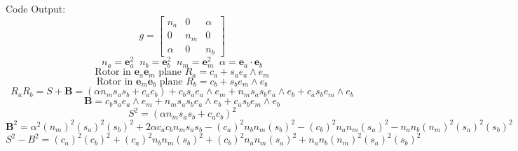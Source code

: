 \documentclass[10pt,fleqn]{report}
\begin{document}
Code Output:
\begin{equation*} g = \left[\begin{matrix}n_{a} & 0 & \alpha \\0 & n_{m} & 0\\\alpha  & 0 & n_{b}\end{matrix}\right] \end{equation*}
\begin{equation*} n_{a} = \bm{e}_{a}^{2}\;\;n_{b} = \bm{e}_{b}^{2}\;\;n_{m} = \bm{e}_{m}^{2}\;\;\alpha = \bm{e}_{a}\cdot\bm{e}_{b} \end{equation*}
\begin{equation*} \mbox{Rotor in }\bm{e}_{a}\bm{e}_{m}\mbox{ plane } R_{a} = c_{a}  + s_{a} e_{a}\wedge e_{m} \end{equation*}
\begin{equation*} \mbox{Rotor in }\bm{e}_{m}\bm{e}_{b}\mbox{ plane } R_{b} = c_{b}  + s_{b} e_{m}\wedge e_{b} \end{equation*}
\begin{equation*} R_{a}R_{b} = S+\bm{B} = \left ( \alpha  n_{m} s_{a} s_{b} + c_{a} c_{b}\right )  + c_{b} s_{a} e_{a}\wedge e_{m} + n_{m} s_{a} s_{b} e_{a}\wedge e_{b} + c_{a} s_{b} e_{m}\wedge e_{b} \end{equation*}
\begin{equation*} \bm{B} = c_{b} s_{a} e_{a}\wedge e_{m} + n_{m} s_{a} s_{b} e_{a}\wedge e_{b} + c_{a} s_{b} e_{m}\wedge e_{b} \end{equation*}
\begin{equation*} S^{2} = \left(\alpha  n_{m} s_{a} s_{b} + c_{a} c_{b}\right)^{2} \end{equation*}
\begin{equation*} \bm{B}^{2} = \alpha ^{2} {\left ( n_{m} \right )}^{2} {\left ( s_{a} \right )}^{2} {\left ( s_{b} \right )}^{2} + 2 \alpha  c_{a} c_{b} n_{m} s_{a} s_{b} - {\left ( c_{a} \right )}^{2} n_{b} n_{m} {\left ( s_{b} \right )}^{2} - {\left ( c_{b} \right )}^{2} n_{a} n_{m} {\left ( s_{a} \right )}^{2} - n_{a} n_{b} {\left ( n_{m} \right )}^{2} {\left ( s_{a} \right )}^{2} {\left ( s_{b} \right )}^{2} \end{equation*}
\begin{equation*} S^{2}-B^{2} = {\left ( c_{a} \right )}^{2} {\left ( c_{b} \right )}^{2} + {\left ( c_{a} \right )}^{2} n_{b} n_{m} {\left ( s_{b} \right )}^{2} + {\left ( c_{b} \right )}^{2} n_{a} n_{m} {\left ( s_{a} \right )}^{2} + n_{a} n_{b} {\left ( n_{m} \right )}^{2} {\left ( s_{a} \right )}^{2} {\left ( s_{b} \right )}^{2} \end{equation*}
\end{document}
